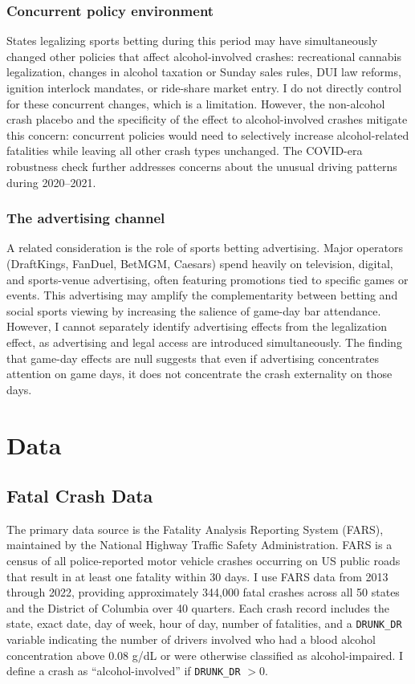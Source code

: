 \documentclass[12pt]{article}
\begin{document}
\subsubsection*{Concurrent policy environment} States legalizing sports betting during this period may have simultaneously changed other policies that affect alcohol-involved crashes: recreational cannabis legalization, changes in alcohol taxation or Sunday sales rules, DUI law reforms, ignition interlock mandates, or ride-share market entry. I do not directly control for these concurrent changes, which is a limitation. However, the non-alcohol crash placebo and the specificity of the effect to alcohol-involved crashes mitigate this concern: concurrent policies would need to selectively increase alcohol-related fatalities while leaving all other crash types unchanged. The COVID-era robustness check further addresses concerns about the unusual driving patterns during 2020--2021.

\subsubsection*{The advertising channel} A related consideration is the role of sports betting advertising. Major operators (DraftKings, FanDuel, BetMGM, Caesars) spend heavily on television, digital, and sports-venue advertising, often featuring promotions tied to specific games or events. This advertising may amplify the complementarity between betting and social sports viewing by increasing the salience of game-day bar attendance. However, I cannot separately identify advertising effects from the legalization effect, as advertising and legal access are introduced simultaneously. The finding that game-day effects are null suggests that even if advertising concentrates attention on game days, it does not concentrate the crash externality on those days.


\section{Data}

\subsection{Fatal Crash Data}

The primary data source is the Fatality Analysis Reporting System (FARS), maintained by the National Highway Traffic Safety Administration. FARS is a census of all police-reported motor vehicle crashes occurring on US public roads that result in at least one fatality within 30 days. I use FARS data from 2013 through 2022, providing approximately 344,000 fatal crashes across all 50 states and the District of Columbia over 40 quarters. Each crash record includes the state, exact date, day of week, hour of day, number of fatalities, and a \texttt{DRUNK\_DR} variable indicating the number of drivers involved who had a blood alcohol concentration above 0.08 g/dL or were otherwise classified as alcohol-impaired. I define a crash as ``alcohol-involved'' if \texttt{DRUNK\_DR} $> 0$.
\end{document}
